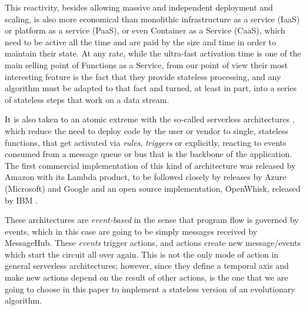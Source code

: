 \documentclass[sigconf]{acmart}
\begin{document}
  This
  reactivity, besides allowing massive and independent deployment and
  scaling, is also more economical than monolithic infrastructure as
  a service (IaaS) or platform as a service (PaaS), or even Container
  as a Service (CaaS), which need to be active all the time and are
  paid by the size and time in order to maintain their state. At any
  rate, while the ultra-fast activation time is one of the main
  selling point of Functions as a Service, from our point of view
  their most interesting feature is the fact that they provide
  stateless processing, and any algorithm must be adapted to that fact
  and turned, at least in part, into a series of stateless steps that
  work on a data stream.

  It is also taken to an atomic extreme
  with the so-called serverless architectures \cite{Varghese2018849},
  which reduce the need to deploy code by the user or vendor to single, stateless
  functions, that get activated via {\em rules}, {\em triggers} or
  explicitly, reacting to events consumed from
  a message queue or bus that
  is the backbone of the application. The first commercial
  implementation of this kind of architecture was released by Amazon
  with its Lambda product, to be followed closely by releases by Azure
  (Microsoft) and Google and an open source implementation, OpenWhisk,
  released by IBM \cite{Baldini2016287}.

These architectures are {\em event-based} in the sense that program
flow is governed by events, which in this case are going to be simply
messages received by MessageHub. These {\em events} trigger actions,
and actions create new message/events which start the circuit all over
again. This is not the only mode of action in general serverless
architectures; however, since they define a temporal axis and make new
actions depend on the result of other actions, is the one that we are
going to choose in this paper to implement a stateless version of an
evolutionary algorithm. 
\end{document}
